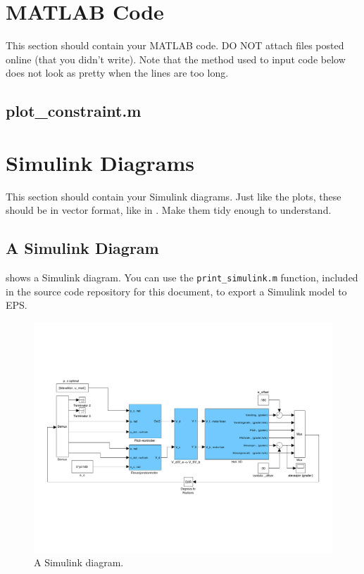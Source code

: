 \appendix

\section{MATLAB Code}\label{sec:matlab}
This section should contain your MATLAB code. DO NOT attach files posted online (that you didn't write). Note that the method used to input code below does not look as pretty when the lines are too long.

\subsection{plot\_constraint.m}\label{sec:plot_constraint_m}
\section{Simulink Diagrams}\label{sec:simulink}
This section should contain your Simulink diagrams. Just like the plots, these should be in vector format, like in . Make them tidy enough to understand.

\subsection{A Simulink Diagram}
 shows a Simulink diagram. You can use the \texttt{print\_simulink.m} function, included in the source code repository for this document, to export a Simulink model to EPS\@.
\begin{figure}[htb]
	\centering
		\includegraphics[width = \textwidth]{figures/simulink_fra_mal.pdf}
	\caption{A Simulink diagram.}
\label{fig:simulink}
\end{figure}
